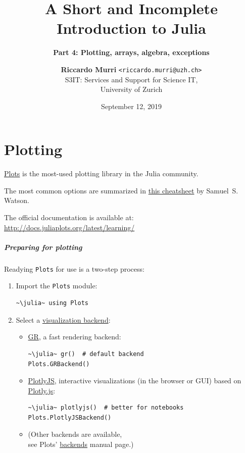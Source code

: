 \documentclass[english,serif,mathserif,xcolor=pdftex,dvipsnames,table]{beamer}
\title[4. Plotting, arrays, etc.]{%
  A Short and Incomplete Introduction to Julia
}
\subtitle{\bfseries Part 4: Plotting, arrays, algebra, exceptions}
\author[R.~Murri]{%
  \textbf{Riccardo Murri} \texttt{<riccardo.murri@uzh.ch>}
  \\
  S3IT: Services and Support for Science IT,
  \\
  University of Zurich
}
\date{September 12, 2019}
\begin{document}
\maketitle

\part{Plotting}
\begin{frame}[fragile]
  \href{http://docs.juliaplots.org/}{Plots} is the most-used plotting
  library in the Julia community.

  \+
  The most common options are summarized in
  \href{https://github.com/sswatson/cheatsheets/blob/master/plotsjl-cheatsheet.pdf}{this
    cheatsheet} by Samuel~S. Watson.

  \+ The official documentation is available at:
  \url{http://docs.juliaplots.org/latest/learning/}
\end{frame}


\begin{frame}[fragile]
  \frametitle{Preparing for plotting}

  Readying \texttt{Plots} for use is a two-step process:
  \begin{enumerate}
  \item Import the \texttt{Plots} module:
\begin{lstlisting}
~\julia~ using Plots
\end{lstlisting}
  \item Select a \href{http://docs.juliaplots.org/latest/tutorial/#plotting-backends}{visualization backend}:
    \begin{itemize}
    \item \href{http://docs.juliaplots.org/latest/examples/gr/}{GR}, a
      fast rendering backend:
\begin{lstlisting}
~\julia~ gr()  # default backend
Plots.GRBackend()
\end{lstlisting}
    \item
      \href{http://docs.juliaplots.org/latest/examples/plotlyjs/}{PlotlyJS},
      interactive visualizations (in the browser or GUI) based on
      \href{https://plot.ly/javascript/}{Plotly.js}:
\begin{lstlisting}
~\julia~ plotlyjs()  # better for notebooks
Plots.PlotlyJSBackend()
\end{lstlisting}
    \item (Other backends are available, \\ see Plots' \href{http://docs.juliaplots.org/latest/backends/}{backends} manual page.)
    \end{itemize}
  \end{enumerate}
\end{frame}
\end{document}
